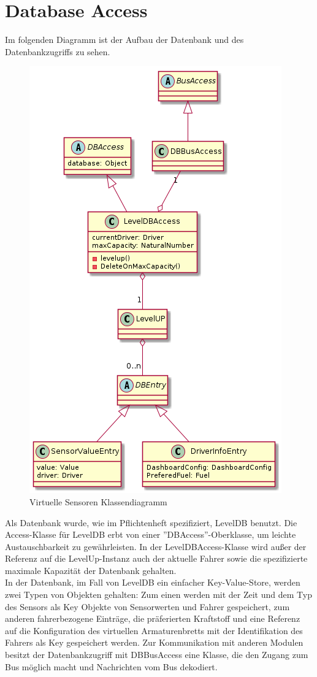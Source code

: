 \documentclass[entwurf.tex]{subfiles}
\begin{document}
  	\section{Database Access}
  		Im folgenden Diagramm ist der Aufbau der Datenbank und des Datenbankzugriffs zu sehen.
  		\begin{figure}[H]
  			\begin{center}
 				\includegraphics[height=0.8\textheight]{diagrams/DBAccess.png}
  				\caption{Virtuelle Sensoren Klassendiagramm}
  			\end{center}
  		\end{figure}
  	Als Datenbank wurde, wie im Pflichtenheft spezifiziert, LevelDB benutzt. Die Access-Klasse für LevelDB erbt von einer ''DBAccess''-Oberklasse, um leichte Austauschbarkeit zu gewährleisten. In der LevelDBAccess-Klasse wird außer der Referenz auf die LevelUp-Instanz auch der aktuelle Fahrer sowie die spezifizierte maximale Kapazität der Datenbank gehalten. \\ In der Datenbank, im Fall von LevelDB ein einfacher Key-Value-Store, werden zwei Typen von Objekten gehalten: Zum einen werden mit der Zeit und dem Typ des Sensors als Key Objekte von Sensorwerten und Fahrer gespeichert, zum anderen fahrerbezogene Einträge, die präferierten Kraftstoff und eine Referenz auf die Konfiguration des virtuellen Armaturenbretts mit der Identifikation des Fahrers als Key gespeichert werden. Zur Kommunikation mit anderen Modulen besitzt der Datenbankzugriff mit DBBusAccess eine Klasse, die den Zugang zum Bus möglich macht und Nachrichten vom Bus dekodiert. 
  	
\end{document}
